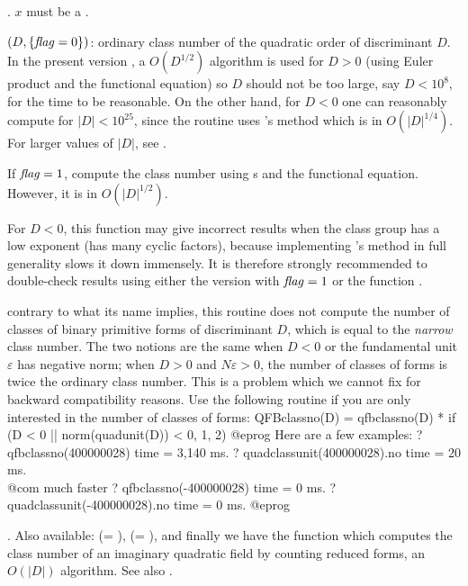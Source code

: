 . $x$ must be a .

$(D,\{\hbox{\it f\kern0pt lag\/}=0\})$: ordinary class number of the quadratic
order of discriminant $D$. In the present version \vers, a $O(D^{1/2})$
algorithm is used for $D > 0$ (using Euler product and the functional
equation) so $D$ should not be too large, say $D < 10^8$, for the time to be
reasonable. On the other hand, for $D < 0$ one can reasonably compute
 for $|D|<10^{25}$, since the routine uses
's method which is in $O(|D|^{1/4})$. For larger values of $|D|$,
see .

If $\hbox{\it f\kern0pt lag\/}=1$, compute the class number using s and the
functional equation. However, it is in $O(|D|^{1/2})$.

 For $D < 0$, this function may give incorrect
results when the class group has a low exponent (has many cyclic factors),
because implementing 's method in full generality slows it down
immensely. It is therefore strongly recommended to double-check results using
either the version with $\hbox{\it f\kern0pt lag\/} = 1$ or the function .

 contrary to what its name implies, this routine does not
compute the number of classes of binary primitive forms of discriminant $D$,
which is equal to the \emph{narrow} class number. The two notions are the same
when $D < 0$ or the fundamental unit $\varepsilon$ has negative norm; when $D
> 0$ and $N\varepsilon > 0$, the number of classes of forms is twice the
ordinary class number. This is a problem which we cannot fix for backward
compatibility reasons. Use the following routine if you are only interested
in the number of classes of forms:
\bprog
QFBclassno(D) =
  qfbclassno(D) * if (D < 0 || norm(quadunit(D)) < 0, 1, 2)
@eprog\noindent
Here are a few examples:
\bprog
? qfbclassno(400000028)
time = 3,140 ms.
? quadclassunit(400000028).no
time = 20 ms. \\@com{ much faster}
? qfbclassno(-400000028)
time = 0 ms.
? quadclassunit(-400000028).no
time = 0 ms.
@eprog

. Also available:
 (= ),
 (= ), and finally
we have the function  which computes the class number of
an imaginary quadratic field by counting reduced forms, an $O(|D|)$
algorithm. See also .

